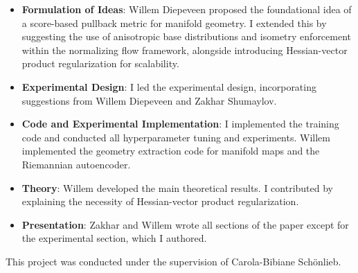 \begin{itemize}
\item \textbf{Formulation of Ideas}: Willem Diepeveen proposed the foundational idea of a score-based pullback metric for manifold geometry. I extended this by suggesting the use of anisotropic base distributions and isometry enforcement within the normalizing flow framework, alongside introducing Hessian-vector product regularization for scalability.
\item \textbf{Experimental Design}: I led the experimental design, incorporating suggestions from Willem Diepeveen and Zakhar Shumaylov.
\item \textbf{Code and Experimental Implementation}: I implemented the training code and conducted all hyperparameter tuning and experiments. Willem implemented the geometry extraction code for manifold maps and the Riemannian autoencoder.
\item \textbf{Theory}: Willem developed the main theoretical results. I contributed by explaining the necessity of Hessian-vector product regularization.
\item \textbf{Presentation}: Zakhar and Willem wrote all sections of the paper except for the experimental section, which I authored.
\end{itemize}

This project was conducted under the supervision of Carola-Bibiane Sch\"onlieb.